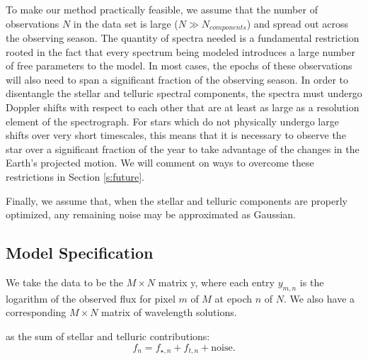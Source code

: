 \documentclass[twocolumn]{aastex62}
\begin{document}
To make our method practically feasible, we assume that the number of observations $N$ in the data set is large ($N \gg N_{components}$) and spread out across the observing season. 
The quantity of spectra needed is a fundamental restriction rooted in the fact that every spectrum being modeled introduces a large number of free parameters to the model. 
In most cases, the epochs of these observations will also need to span a significant fraction of the observing season. 
In order to disentangle the stellar and telluric spectral components, the spectra must undergo Doppler shifts with respect to each other that are at least as large as a resolution element of the spectrograph. 
For stars which do not physically undergo large \RV shifts over very short timescales, this means that it is necessary to observe the star over a significant fraction of the year to take advantage of the changes in the Earth's projected motion. 
We will comment on ways to overcome these restrictions in Section \ref{s:future}.

Finally, we assume that, when the stellar and telluric components are properly optimized, any remaining noise may be approximated as Gaussian. 

\subsection{Model Specification}
\label{s:model-eqns}

We take the data to be the $M \times N$ matrix y, where each entry $y_{m,n}$ is the logarithm of the observed flux for pixel $m$ of $M$ at epoch $n$ of $N$. 
We also have a corresponding $M \times N$ matrix of wavelength solutions.

 as the sum of stellar and telluric contributions:
\begin{equation}
f_n = f_{\star,n} + f_{t,n} + \textrm{noise}.
\end{equation}
\end{document}
